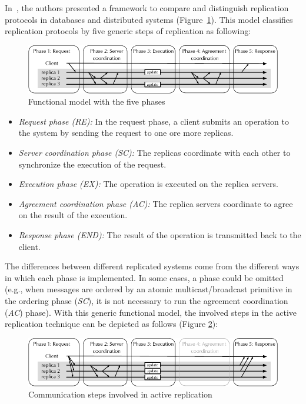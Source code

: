In~\cite{wiesmann2000understanding}, the authors presented a
framework to compare and distinguish replication protocols in databases
and distributed systems (Figure~\ref{fig:replication:org}). This model
classifies replication protocols by five generic steps of replication as
following:

\begin{figure}[ht!]
  \begin{minipage}[b]{1.0\linewidth}
  \centering
        \includegraphics[width=1\linewidth]{figures/replication-original}
  \end{minipage}
  \caption{Functional model with the five phases}
  \label{fig:replication:org}
\end{figure}

\begin{itemize}
  \item \textit{Request phase (RE):} In the request phase, a client submits an
     operation to the system by sending the request to one ore more replicas.
  \item \textit{Server coordination phase (SC):} The replicas coordinate
  with each other to synchronize the execution of the request.
  \item \textit{Execution phase (EX):} The operation is executed on the replica servers.
  \item \textit{Agreement coordination phase (AC):} The replica servers
  coordinate to agree on the result of the execution.
  \item \textit{Response phase (END):} The result of the operation is
  transmitted back to the client.
\end{itemize}

The differences between different replicated systems come from the different
ways in which each phase is implemented. In some cases, a phase could be omitted (e.g.,
when messages are ordered by an atomic multicast/broadcast primitive in the
ordering phase (\emph{SC}), it is not necessary to run the agreement
coordination (\emph{AC}) phase). With this generic functional model, the
involved steps in the active replication technique can be depicted as follows
(Figure \ref{fig:replication:active}):

\begin{figure}[ht!]
  \begin{minipage}[b]{1.0\linewidth}
  \centering
        \includegraphics[width=1\linewidth]{figures/replication-active}
  \end{minipage}
  \caption{Communication steps involved in active replication}
  \label{fig:replication:active}
\end{figure}

